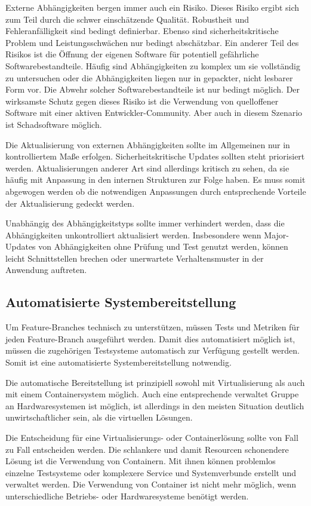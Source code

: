 Externe Abhängigkeiten bergen immer auch ein Risiko. Dieses Risiko ergibt sich zum Teil durch die schwer einschätzende Qualität. Robustheit und Fehleranfälligkeit sind bedingt definierbar. Ebenso sind sicherheitskritische Problem und Leistungsschwächen nur bedingt abschätzbar. Ein anderer Teil des Risikos ist die Öffnung der eigenen Software für potentiell gefährliche Softwarebestandteile. Häufig sind Abhängigkeiten zu komplex um sie vollständig zu untersuchen oder die Abhängigkeiten liegen nur in gepackter, nicht lesbarer Form vor. Die Abwehr solcher Softwarebestandteile ist nur bedingt möglich. Der wirksamste Schutz gegen dieses Risiko ist die Verwendung von quelloffener Software mit einer aktiven Entwickler-Community. Aber auch in diesem Szenario ist Schadsoftware möglich.

Die Aktualisierung von externen Abhängigkeiten sollte im Allgemeinen nur in kontrolliertem Maße erfolgen. Sicherheitskritische Updates sollten steht priorisiert werden. Aktualisierungen anderer Art sind allerdings kritisch zu sehen, da sie häufig mit Anpassung in den internen Strukturen zur Folge haben. Es muss somit abgewogen werden ob die notwendigen Anpassungen durch entsprechende Vorteile der Aktualisierung gedeckt werden.

Unabhängig des Abhängigkeitstyps sollte immer verhindert werden, dass die Abhängigkeiten unkontrolliert aktualisiert werden. Insbesondere wenn Major-Updates von Abhängigkeiten ohne Prüfung und Test genutzt werden, können leicht Schnittstellen brechen oder unerwartete Verhaltensmuster in der Anwendung auftreten.

\subsection{Automatisierte Systembereitstellung}

Um Feature-Branches technisch zu unterstützen, müssen Tests und Metriken für jeden Feature-Branch ausgeführt werden. Damit dies automatisiert möglich ist, müssen die zugehörigen Testsysteme automatisch zur Verfügung gestellt werden. Somit ist eine automatisierte Systembereitstellung notwendig.

Die automatische Bereitstellung ist prinzipiell sowohl mit Virtualisierung als auch mit einem Containersystem möglich. Auch eine entsprechende verwaltet Gruppe an Hardwaresystemen ist möglich, ist allerdings in den meisten Situation deutlich unwirtschaftlicher sein, als die virtuellen Lösungen.

Die Entscheidung für eine Virtualisierungs- oder Containerlösung sollte von Fall zu Fall entscheiden werden. Die schlankere und damit Resourcen schonendere Lösung ist die Verwendung von Containern. Mit ihnen können problemlos einzelne Testsysteme oder komplexere Service und Systemverbunde erstellt und verwaltet werden. Die Verwendung von Container ist nicht mehr möglich, wenn unterschiedliche Betriebs- oder Hardwaresysteme benötigt werden.

